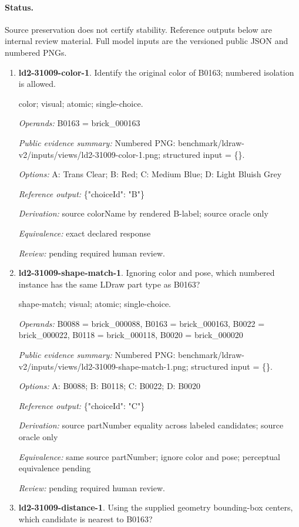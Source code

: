 \paragraph{Status.}Source preservation does not certify stability. Reference outputs below are internal review material. Full model inputs are the versioned public JSON and numbered PNGs.
\begin{enumerate}
\item \textbf{ld2-31009-color-1}. Identify the original color of B0163; numbered isolation is allowed.
\par{\small color; visual; atomic; single-choice.\par\textit{Operands:} B0163 = brick\_000163\par\textit{Public evidence summary:} Numbered PNG: benchmark/ldraw-v2/inputs/views/ld2-31009-color-1.png; structured input = \{\}.\par\textit{Options:} A: Trans Clear; B: Red; C: Medium Blue; D: Light Bluish Grey\par\textit{Reference output:} \{"choiceId": "B"\}\par\textit{Derivation:} source colorName by rendered B-label; source oracle only\par\textit{Equivalence:} exact declared response\par\textit{Review:} pending required human review.}
\item \textbf{ld2-31009-shape-match-1}. Ignoring color and pose, which numbered instance has the same LDraw part type as B0163?
\par{\small shape-match; visual; atomic; single-choice.\par\textit{Operands:} B0088 = brick\_000088, B0163 = brick\_000163, B0022 = brick\_000022, B0118 = brick\_000118, B0020 = brick\_000020\par\textit{Public evidence summary:} Numbered PNG: benchmark/ldraw-v2/inputs/views/ld2-31009-shape-match-1.png; structured input = \{\}.\par\textit{Options:} A: B0088; B: B0118; C: B0022; D: B0020\par\textit{Reference output:} \{"choiceId": "C"\}\par\textit{Derivation:} source partNumber equality across labeled candidates; source oracle only\par\textit{Equivalence:} same source partNumber; ignore color and pose; perceptual equivalence pending\par\textit{Review:} pending required human review.}
\item \textbf{ld2-31009-distance-1}. Using the supplied geometry bounding-box centers, which candidate is nearest to B0163?

\end{enumerate}
